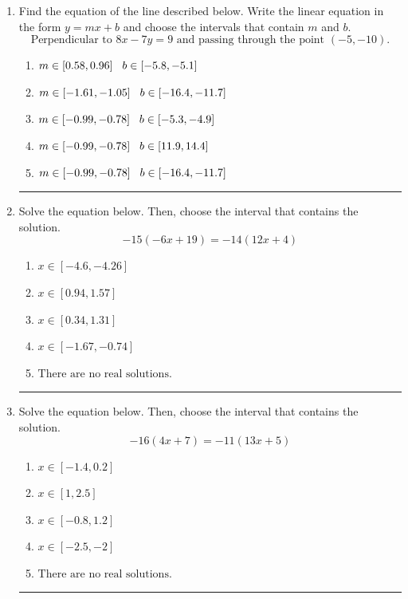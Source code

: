 \documentclass[14pt]{extbook}
\newcommand{\litem}[1]{\item#1\hspace*{-1cm}\rule{\textwidth}{0.4pt}}
\begin{document}
\begin{enumerate}
{\begin{enumerate}[label=\Alph*.]
\end{enumerate} }
\litem{
Find the equation of the line described below. Write the linear equation in the form $ y=mx+b $ and choose the intervals that contain $m$ and $b$.\[ \text{Perpendicular to } 8 x - 7 y = 9 \text{ and passing through the point } (-5, -10). \]\begin{enumerate}[label=\Alph*.]
\item \( m \in [0.58, 0.96] \hspace*{3mm} b \in [-5.8, -5.1] \)
\item \( m \in [-1.61, -1.05] \hspace*{3mm} b \in [-16.4, -11.7] \)
\item \( m \in [-0.99, -0.78] \hspace*{3mm} b \in [-5.3, -4.9] \)
\item \( m \in [-0.99, -0.78] \hspace*{3mm} b \in [11.9, 14.4] \)
\item \( m \in [-0.99, -0.78] \hspace*{3mm} b \in [-16.4, -11.7] \)

\end{enumerate} }
\litem{
Solve the equation below. Then, choose the interval that contains the solution.\[ -15(-6x + 19) = -14(12x + 4) \]\begin{enumerate}[label=\Alph*.]
\item \( x \in [-4.6, -4.26] \)
\item \( x \in [0.94, 1.57] \)
\item \( x \in [0.34, 1.31] \)
\item \( x \in [-1.67, -0.74] \)
\item \( \text{There are no real solutions.} \)

\end{enumerate} }
\litem{
Solve the equation below. Then, choose the interval that contains the solution.\[ -16(4x + 7) = -11(13x + 5) \]\begin{enumerate}[label=\Alph*.]
\item \( x \in [-1.4, 0.2] \)
\item \( x \in [1, 2.5] \)
\item \( x \in [-0.8, 1.2] \)
\item \( x \in [-2.5, -2] \)
\item \( \text{There are no real solutions.} \)


\end{enumerate}}
\end{enumerate}
\end{document}
